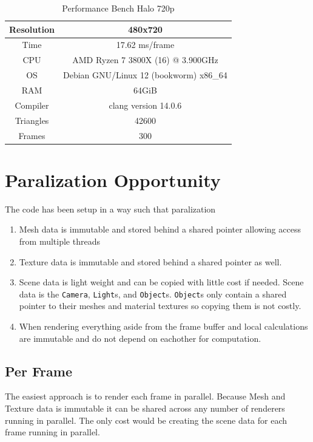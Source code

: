 \documentclass[12pt]{article}
\begin{document}
\begin{table}[H]
	\caption{Performance Bench Halo 720p}
	\centering
	\begin{tabular}{|c|c|}
		\hline
		Resolution& 480x720\\\hline
		Time& 17.62 ms/frame\\\hline
		CPU&AMD Ryzen 7 3800X (16) @ 3.900GHz\\\hline
		OS&Debian GNU/Linux 12 (bookworm) x86\_64\\\hline
		RAM&64GiB\\\hline
		Compiler&clang version 14.0.6\\\hline
		Triangles&42600\\\hline
		Frames&300\\\hline
	\end{tabular}
	\label{table:performance-720-halo}
\end{table}



\section{Paralization Opportunity}
The code has been setup in a way such that paralization 

\begin{enumerate}
	\item Mesh data is immutable and stored behind a shared pointer allowing access from multiple threads
	\item Texture data is immutable and stored behind a shared pointer as well.
	\item Scene data is light weight and can be copied with little cost if needed.
	\subitem Scene data is the \texttt{Camera}, \texttt{Light}s, and \texttt{Object}s.
	\subitem \texttt{Object}s only contain a shared pointer to their meshes and material textures so copying them is not costly.
	\item When rendering everything aside from the frame buffer and local calculations are immutable and do not depend on eachother for computation.
\end{enumerate}

\subsection{Per Frame}
The easiest approach is to render each frame in parallel. Because Mesh and Texture data is immutable it can be shared across any number of renderers running in parallel. The only cost would be creating the scene data for each frame running in parallel.
\end{document}
